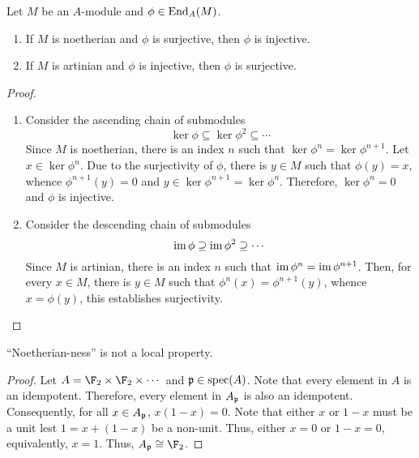 \begin{proposition}
    Let $M$ be an $A$-module and $\phi\in\operatorname{End}_A(M)$. 
    \begin{enumerate}[label=(\alph*)]
        \item If $M$ is noetherian and $\phi$ is surjective, then $\phi$ is injective.
        \item If $M$ is artinian and $\phi$ is injective, then $\phi$ is surjective.
    \end{enumerate}
\end{proposition}
\begin{proof}
\begin{enumerate}[label=(\alph*)]
\item Consider the ascending chain of submodules
\begin{equation*}
    \ker\phi\subseteq\ker\phi^2\subseteq\cdots
\end{equation*}
Since $M$ is noetherian, there is an index $n$ such that $\ker\phi^n = \ker\phi^{n + 1}$. Let $x\in\ker\phi^n$. Due to the surjectivity of $\phi$, there is $y\in M$ such that $\phi(y) = x$, whence $\phi^{n + 1}(y) = 0$ and $y\in\ker\phi^{n + 1} = \ker\phi^n$. Therefore, $\ker\phi^n = 0$ and $\phi$ is injective.

\item Consider the descending chain of submodules
\begin{equation*}
    \operatorname{im}\phi\supseteq\operatorname{im}\phi^2\supseteq\cdots
\end{equation*}
Since $M$ is artinian, there is an index $n$ such that $\operatorname{im}\phi^n = \operatorname{im}\phi^{n + 1}$. Then, for every $x\in M$, there is $y\in M$ such that $\phi^n(x) = \phi^{n + 1}(y)$, whence $x = \phi(y)$, this establishes surjectivity.
\end{enumerate}
\end{proof}

\begin{lemma}
    ``Noetherian-ness'' is not a local property.
\end{lemma}
\begin{proof}
    Let $A = \F_2\times\F_2\times\cdots$ and $\mathfrak p\in\operatorname{spec}(A)$. Note that every element in $A$ is an idempotent. Therefore, every element in $A_\mathfrak p$ is also an idempotent. Consequently, for all $x\in A_\mathfrak p$, $x(1 - x) = 0$. Note that either $x$ or $1 - x$ must be a unit lest $1 = x + (1 - x)$ be a non-unit. Thus, either $x = 0$ or $1 - x = 0$, equivalently, $x = 1$. Thus, $A_\frakp\cong\F_2$.
\end{proof}

